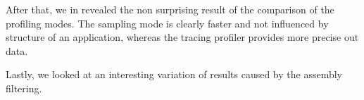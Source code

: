 After that, we in revealed the non surprising result of the comparison of the profiling modes. The sampling mode is clearly faster and not influenced by structure of an application, whereas the tracing profiler provides more precise out data.

Lastly, we looked at an interesting variation of results caused by the assembly filtering.

